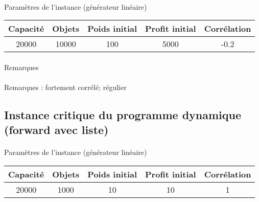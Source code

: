 \documentclass[12pt]{article}
\begin{document}
\paragraph{}Paramètres de l'instance (générateur linéaire)

\begin{tabular}{|c|c|c|c|c|}
\hline
Capacité & Objets & Poids initial & Profit initial & Corrélation \\
\hline
20000 & 10000 & 100 & 5000 & -0.2 \\
\hline
\end{tabular}


\paragraph{}Remarques

\begin{figure}[!h]
\begin{floatrow}
\end{floatrow}
\end{figure}

\paragraph{}Remarques : fortement corrélé; régulier

\subsection{Instance critique du programme dynamique (forward avec liste)}

\paragraph{}Paramètres de l'instance (générateur linéaire)

\begin{tabular}{|c|c|c|c|c|}
	\hline
	Capacité & Objets & Poids initial & Profit initial & Corrélation \\
	\hline
	20000 & 1000 & 10 & 10 & 1 \\
	\hline
\end{tabular}
\end{document}
